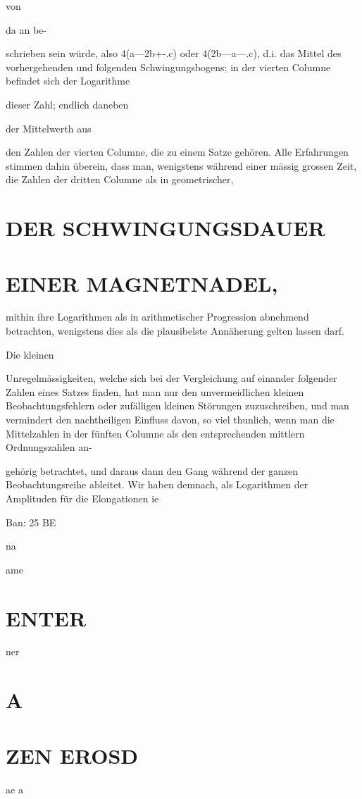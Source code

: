 \documentclass[12pt,a4paper]{article}
\begin{document}
von

da an be-

schrieben sein würde, also 4(a—2b+-.c) oder 4(2b—a—.c), d.i. das Mittel des vorhergehenden und folgenden Schwingungsbogens; in der vierten Columne befindet sich der Logarithme

dieser Zahl; endlich daneben

der Mittelwerth aus

den Zahlen der vierten Columne, die zu einem Satze gehören. Alle Erfahrungen stimmen dahin überein, dass man, wenigstens während einer mässig grossen Zeit, die Zahlen der dritten Columne als in geometrischer,

\section*{DER SCHWINGUNGSDAUER}
\section*{EINER MAGNETNADEL,}
mithin ihre Logarithmen als in arithmetischer Progression abnehmend betrachten, wenigstens dies als die plausibelste Annäherung gelten lassen darf.

Die kleinen

Unregelmässigkeiten, welche sich bei der Vergleichung auf einander folgender Zahlen eines Satzes finden, hat man nur den unvermeidlichen kleinen Beobachtungsfehlern oder zufälligen kleinen Störungen zuzuschreiben, und man vermindert den nachtheiligen Einfluss davon, so viel thunlich, wenn man die Mittelzahlen in der fünften Columne als den entsprechenden mittlern Ordnungszahlen an-

gehörig betrachtet, und daraus dann den Gang während der ganzen Beobachtungsreihe ableitet. Wir haben demnach, als Logarithmen der Amplituden für die Elongationen ie

Ban: 25 BE

na

ame

\section*{ENTER}
ner

\section*{A}
\section*{ZEN EROSD}
ae a
\end{document}
